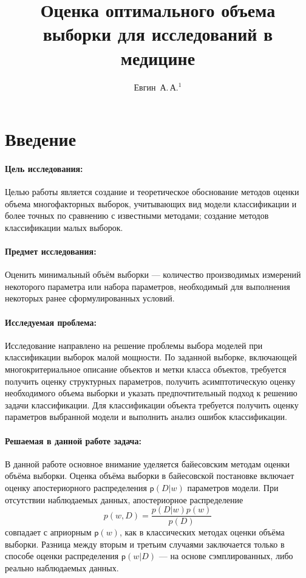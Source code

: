 \documentclass[12pt,twoside]{article}
\title
    [Оценка оптимального объема выборки для исследований в медицине]
    {Оценка оптимального объема выборки для исследований в медицине}
\author
    {Евгин~А.\,А.$^1$} %
\begin{document}
\maketitle

\section{Введение}
\paragraph{Цель исследования:}
Целью работы является создание и теоретическое обоснование методов оценки объема многофакторных выборок, учитывающих вид модели классификации и более точных по сравнению с известными методами; создание методов классификации малых выборок.
\paragraph{Предмет исследования:}
Оценить минимальный объём выборки — количество производимых измерений некоторого параметра или набора параметров, необходимый для выполнения некоторых ранее сформулированных условий.
\paragraph{Исследуемая проблема:}
Исследование направлено на решение проблемы выбора моделей при классификации выборок малой мощности. По заданной выборке, включающей многокритериальное описание объектов и метки класса объектов, требуется получить оценку структурных параметров, получить асимптотическую оценку необходимого объема выборки и указать предпочтительный подход к решению задачи классификации. Для классификации объекта требуется получить оценку параметров выбранной модели и выполнить анализ ошибок классификации.
\paragraph{Решаемая в данной работе задача:}
В данной работе основное внимание уделяется байесовским методам оценки объёма выборки. Оценка объёма выборки в байесовской постановке включает оценку апостериорного распределения $\mathsf{p}(D|w)$ параметров модели. При отсутствии наблюдаемых данных, апостериорное распределение$$ p(w,D) = \frac{p(D|w)p(w)}{p(D)}$$ совпадает с априорным $\mathsf{p}(w)$, как в классических методах оценки объёма выборки. Разница между вторым и третьим случаями заключается только в способе оценки распределения $\mathsf{p}(w|D)$ — на основе сэмплированных, либо реально наблюдаемых данных.
\end{document}
